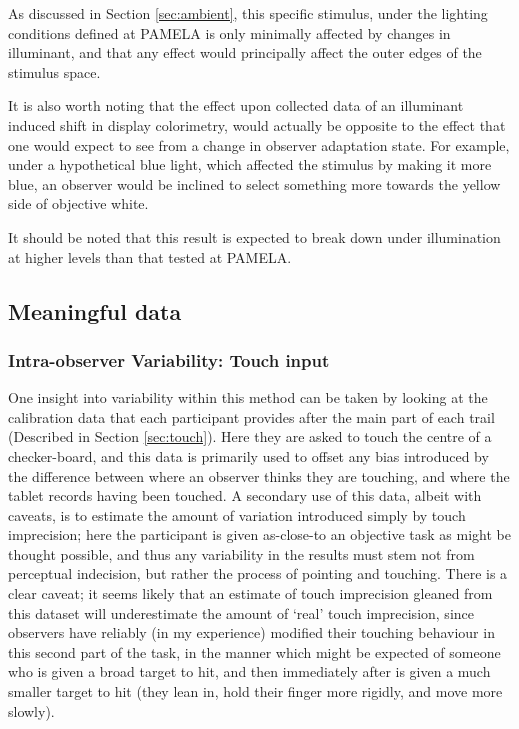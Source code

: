 As discussed in Section \ref{sec:ambient}, this specific stimulus, under the lighting conditions defined at \gls{PAMELA} is only minimally affected by changes in illuminant, and that any effect would principally affect the outer edges of the stimulus space.

It is also worth noting that the effect upon collected data of an illuminant induced shift in display colorimetry, would actually be opposite to the effect that one would expect to see from a change in observer adaptation state. For example, under a hypothetical blue light, which affected the stimulus by making it more blue, an observer would be inclined to select something more towards the yellow side of objective white. 

It should be noted that this result is expected to break down under illumination at higher levels than that tested at \gls{PAMELA}.

\subsection{Meaningful data}

\subsubsection{Intra-observer Variability: Touch input}

One insight into variability within this method can be taken by looking at the calibration data that each participant provides after the main part of each trail (Described in Section \ref{sec:touch}). Here they are asked to touch the centre of a checker-board, and this data is primarily used to offset any bias introduced by the difference between where an observer thinks they are touching, and where the tablet records having been touched. A secondary use of this data, albeit with caveats, is to estimate the amount of variation introduced simply by touch imprecision; here the participant is given as-close-to an objective task as might be thought possible, and thus any variability in the results must stem not from perceptual indecision, but rather the process of pointing and touching. There is a clear caveat; it seems likely that an estimate of touch imprecision gleaned from this dataset will underestimate the amount of `real' touch imprecision, since observers have reliably (in my experience) modified their touching behaviour in this second part of the task, in the manner which might be expected of someone who is given a broad target to hit, and then immediately after is given a much smaller target to hit (they lean in, hold their finger more rigidly, and move more slowly).


